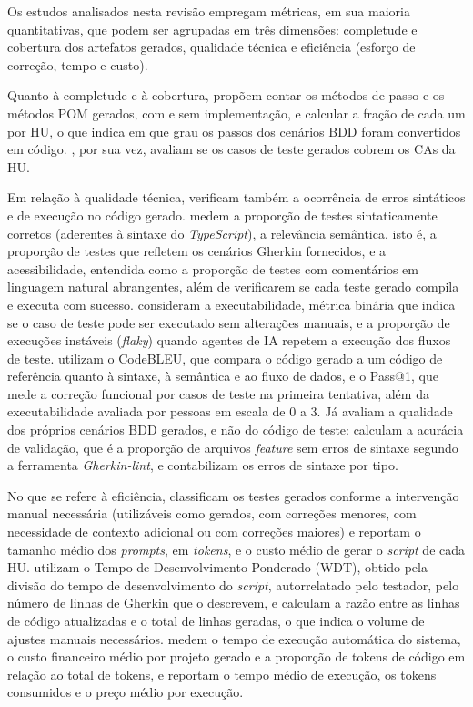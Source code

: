 Os estudos analisados nesta revisão empregam métricas, em sua maioria quantitativas, que podem ser agrupadas em três dimensões: completude e cobertura dos artefatos gerados, qualidade técnica e eficiência (esforço de correção, tempo e custo).

Quanto à completude e à cobertura,  propõem contar os métodos de passo e os métodos POM gerados, com e sem implementação, e calcular a fração de cada um por HU, o que indica em que grau os passos dos cenários BDD foram convertidos em código. , por sua vez, avaliam se os casos de teste gerados cobrem os CAs da HU.

Em relação à qualidade técnica,  verificam também a ocorrência de erros sintáticos e de execução no código gerado.  medem a proporção de testes sintaticamente corretos (aderentes à sintaxe do \textit{TypeScript}), a relevância semântica, isto é, a proporção de testes que refletem os cenários Gherkin fornecidos, e a acessibilidade, entendida como a proporção de testes com comentários em linguagem natural abrangentes, além de verificarem se cada teste gerado compila e executa com sucesso.  consideram a executabilidade, métrica binária que indica se o caso de teste pode ser executado sem alterações manuais, e a proporção de execuções instáveis (\textit{flaky}) quando agentes de IA repetem a execução dos fluxos de teste.  utilizam o CodeBLEU, que compara o código gerado a um código de referência quanto à sintaxe, à semântica e ao fluxo de dados, e o Pass@1, que mede a correção funcional por casos de teste na primeira tentativa, além da executabilidade avaliada por pessoas em escala de 0 a 3. Já  avaliam a qualidade dos próprios cenários BDD gerados, e não do código de teste: calculam a acurácia de validação, que é a proporção de arquivos \textit{feature} sem erros de sintaxe segundo a ferramenta \textit{Gherkin-lint}, e contabilizam os erros de sintaxe por tipo.

No que se refere à eficiência,  classificam os testes gerados conforme a intervenção manual necessária (utilizáveis como gerados, com correções menores, com necessidade de contexto adicional ou com correções maiores) e reportam o tamanho médio dos \textit{prompts}, em \textit{tokens}, e o custo médio de gerar o \textit{script} de cada HU.  utilizam o Tempo de Desenvolvimento Ponderado (WDT), obtido pela divisão do tempo de desenvolvimento do \textit{script}, autorrelatado pelo testador, pelo número de linhas de Gherkin que o descrevem, e  calculam a razão entre as linhas de código atualizadas e o total de linhas geradas, o que indica o volume de ajustes manuais necessários.  medem o tempo de execução automática do sistema, o custo financeiro médio por projeto gerado e a proporção de tokens de código em relação ao total de tokens, e  reportam o tempo médio de execução, os tokens consumidos e o preço médio por execução.

